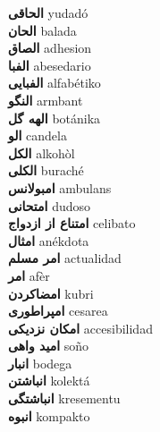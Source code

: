 \textbf{ الحاقی  } yudadó \\
\textbf{ الحان  } balada \\
\textbf{ الصاق  } adhesion \\
\textbf{ الفبا  } abesedario \\
\textbf{ الفبایی  } alfabétiko \\
\textbf{ النگو  } armbant \\
\textbf{ الهه گل  } botánika \\
\textbf{ الو  } candela \\
\textbf{ الکل  } alkohòl \\
\textbf{ الکلی  } buraché \\
\textbf{ امبولانس  } ambulans \\
\textbf{ امتحانی  } dudoso \\
\textbf{ امتناع از ازدواج  } celibato \\
\textbf{ امثال  } anékdota \\
\textbf{ امر مسلم  } actualidad \\
\textbf{ امر  } afèr \\
\textbf{ امضاکردن  } kubri \\
\textbf{ امپراطوری  } cesarea \\
\textbf{ امکان نزدیکی  } accesibilidad \\
\textbf{ امید واهی  } soño \\
\textbf{ انبار  } bodega \\
\textbf{ انباشتن  } kolektá \\
\textbf{ انباشتگی  } kresementu \\
\textbf{ انبوه  } kompakto \\
